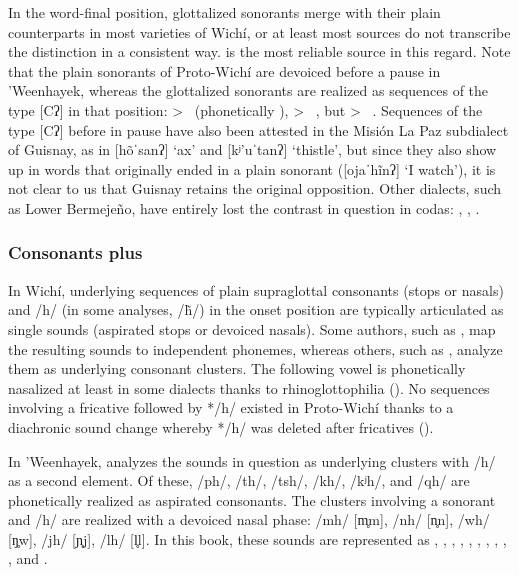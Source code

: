 In the word-final position, glottalized sonorants merge with their plain counterparts in most varieties of Wichí, or at least most sources do not transcribe the distinction in a consistent way. \citet{KC16} is the most reliable source in this regard. Note that the plain sonorants of Proto-Wichí are devoiced before a pause in ’Weenhayek, whereas the glottalized sonorants are realized as sequences of the type [Cʔ] in that position:  >~ (phonetically ),  >~ , but  >~  \citep{KC16}. Sequences of the type [Cʔ] before in pause have also been attested in the Misión La Paz subdialect of Guisnay, as in [hõˈsanʔ] `ax' and [kʲ’uˈtanʔ] `thistle', but since they also show up in words that originally ended in a plain sonorant ([ojaˈhĩnʔ] `I watch'), it is not clear to us that Guisnay retains the original opposition. Other dialects, such as Lower Bermejeño, have entirely lost the contrast in question in codas: , ,  \citep{VN14}.

\subsubsection{Consonants plus }\label{wi-ch}

In Wichí, underlying sequences of plain supraglottal consonants (stops or nasals) and /h/ (in some analyses, /h̃/) in the onset position are typically articulated as single sounds (aspirated stops or devoiced nasals). Some authors, such as \citet{VN14}, map the resulting sounds to independent phonemes, whereas others, such as \citet{KC94}, analyze them as underlying consonant clusters. The following vowel is phonetically nasalized at least in some dialects thanks to rhinoglottophilia (). No sequences involving a fricative followed by */h/ existed in Proto-Wichí thanks to a diachronic sound change whereby */h/ was deleted after fricatives ().

In ’Weenhayek, \citet[29, 31]{KC94} analyzes the sounds in question as underlying clusters with /h/ as a second element. Of these, /ph/, /th/, /tsh/, /kh/, /kʲh/, and /qh/ are phonetically realized as aspirated consonants. The clusters involving a sonorant and /h/ are realized with a devoiced nasal phase: /mh/ [m̥m], /nh/ [n̥n], /wh/ [ŋ̥w], /jh/ [ɲ̥j], /lh/ [l̥l]. In this book, these sounds are represented as , , , , , , , , , , and .

